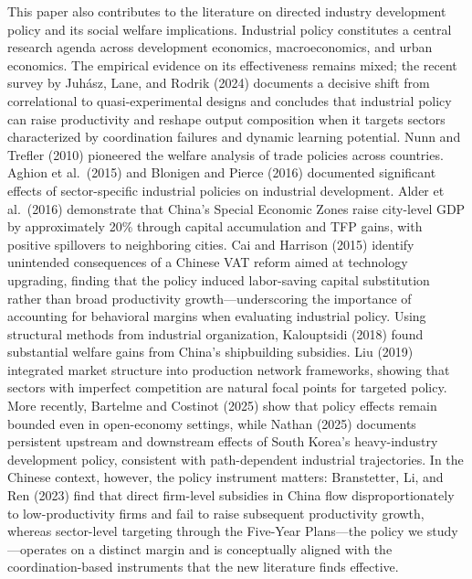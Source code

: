\documentclass[11pt,a4paper]{article}
\begin{document}
This paper also contributes to the literature on directed industry development policy and its social welfare implications. Industrial policy constitutes a central research agenda across development economics, macroeconomics, and urban economics. The empirical evidence on its effectiveness remains mixed; the recent survey by Juh\'asz, Lane, and Rodrik (2024) documents a decisive shift from correlational to quasi-experimental designs and concludes that industrial policy can raise productivity and reshape output composition when it targets sectors characterized by coordination failures and dynamic learning potential. Nunn and Trefler (2010) pioneered the welfare analysis of trade policies across countries. Aghion et al.\ (2015) and Blonigen and Pierce (2016) documented significant effects of sector-specific industrial policies on industrial development. Alder et al.\ (2016) demonstrate that China's Special Economic Zones raise city-level GDP by approximately 20\% through capital accumulation and TFP gains, with positive spillovers to neighboring cities. Cai and Harrison (2015) identify unintended consequences of a Chinese VAT reform aimed at technology upgrading, finding that the policy induced labor-saving capital substitution rather than broad productivity growth---underscoring the importance of accounting for behavioral margins when evaluating industrial policy. Using structural methods from industrial organization, Kalouptsidi (2018) found substantial welfare gains from China's shipbuilding subsidies. Liu (2019) integrated market structure into production network frameworks, showing that sectors with imperfect competition are natural focal points for targeted policy. More recently, Bartelme and Costinot (2025) show that policy effects remain bounded even in open-economy settings, while Nathan (2025) documents persistent upstream and downstream effects of South Korea's heavy-industry development policy, consistent with path-dependent industrial trajectories. In the Chinese context, however, the policy instrument matters: Branstetter, Li, and Ren (2023) find that direct firm-level subsidies in China flow disproportionately to low-productivity firms and fail to raise subsequent productivity growth, whereas sector-level targeting through the Five-Year Plans---the policy we study---operates on a distinct margin and is conceptually aligned with the coordination-based instruments that the new literature finds effective.
\end{document}
